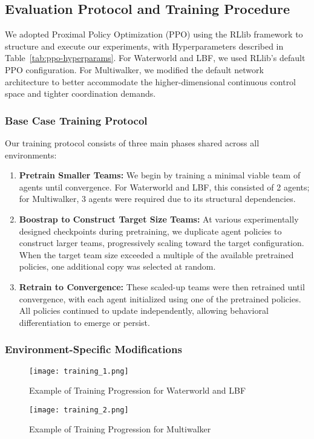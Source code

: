 \subsection{Evaluation Protocol and Training Procedure}

We adopted Proximal Policy Optimization (PPO)\cite{schulman2017} using the RLlib 
framework to structure and execute our experiments, with Hyperparameters described in
Table~\ref{tab:ppo-hyperparams}. For Waterworld and LBF, 
we used RLlib's default PPO configuration. For Multiwalker, we modified the default 
network architecture to better accommodate the higher-dimensional continuous control space and 
tighter coordination demands.

\subsubsection{Base Case Training Protocol}

Our training protocol consists of three main phases shared across all environments:
\begin{enumerate}
    \item \textbf{Pretrain Smaller Teams:} We begin by training a minimal viable team of 
        agents until convergence. For Waterworld and LBF, this consisted of 2 agents; 
        for Multiwalker, 3 agents were required due to its structural dependencies.
    \item \textbf{Boostrap to Construct Target Size Teams:} At various experimentally 
        designed checkpoints during pretraining, we duplicate agent policies to construct 
        larger teams, progressively scaling toward the target configuration. 
        When the target team size exceeded a multiple of the available pretrained policies, 
        one additional copy was selected at random.
    \item \textbf{Retrain to Convergence:} These scaled-up teams were then retrained until 
        convergence, with each agent initialized using one of the pretrained policies. 
        All policies continued to update independently, allowing behavioral differentiation to 
        emerge or persist.
\end{enumerate}

\subsubsection{Environment-Specific Modifications}

\begin{figure}[!ht]
    \centering
    \texttt{[image: training\_1.png]}
    \caption{Example of Training Progression for Waterworld and LBF }
    \label{fig:training_1}
\end{figure}
\begin{figure}[!ht]
    \centering
    \texttt{[image: training\_2.png]}
    \caption{Example of Training Progression for Multiwalker}
    \label{fig:training_2}
\end{figure}


